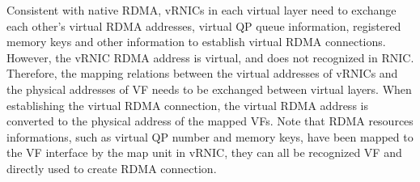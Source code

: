 Consistent with native RDMA, vRNICs in each virtual layer need to exchange each other's virtual RDMA addresses, virtual QP queue information, registered memory keys and other information to establish virtual RDMA connections. However, the vRNIC RDMA address is virtual, and does not recognized in RNIC. Therefore, the mapping relations between the virtual addresses of vRNICs and the physical addresses of VF needs to be exchanged between virtual layers. When establishing the virtual RDMA connection, the virtual RDMA address is converted to the physical address of the mapped VFs. Note that RDMA resources informations, such as virtual QP number and memory keys, have been mapped to the VF interface by the map unit in vRNIC, they can all be recognized VF and directly used to create RDMA connection.

